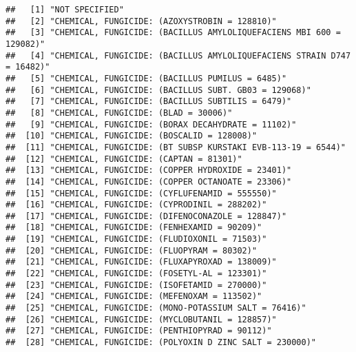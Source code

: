 \documentclass[
]{article}
\begin{document}
\begin{verbatim}
##   [1] "NOT SPECIFIED"                                                                     
##   [2] "CHEMICAL, FUNGICIDE: (AZOXYSTROBIN = 128810)"                                      
##   [3] "CHEMICAL, FUNGICIDE: (BACILLUS AMYLOLIQUEFACIENS MBI 600 = 129082)"                
##   [4] "CHEMICAL, FUNGICIDE: (BACILLUS AMYLOLIQUEFACIENS STRAIN D747 = 16482)"             
##   [5] "CHEMICAL, FUNGICIDE: (BACILLUS PUMILUS = 6485)"                                    
##   [6] "CHEMICAL, FUNGICIDE: (BACILLUS SUBT. GB03 = 129068)"                               
##   [7] "CHEMICAL, FUNGICIDE: (BACILLUS SUBTILIS = 6479)"                                   
##   [8] "CHEMICAL, FUNGICIDE: (BLAD = 30006)"                                               
##   [9] "CHEMICAL, FUNGICIDE: (BORAX DECAHYDRATE = 11102)"                                  
##  [10] "CHEMICAL, FUNGICIDE: (BOSCALID = 128008)"                                          
##  [11] "CHEMICAL, FUNGICIDE: (BT SUBSP KURSTAKI EVB-113-19 = 6544)"                        
##  [12] "CHEMICAL, FUNGICIDE: (CAPTAN = 81301)"                                             
##  [13] "CHEMICAL, FUNGICIDE: (COPPER HYDROXIDE = 23401)"                                   
##  [14] "CHEMICAL, FUNGICIDE: (COPPER OCTANOATE = 23306)"                                   
##  [15] "CHEMICAL, FUNGICIDE: (CYFLUFENAMID = 555550)"                                      
##  [16] "CHEMICAL, FUNGICIDE: (CYPRODINIL = 288202)"                                        
##  [17] "CHEMICAL, FUNGICIDE: (DIFENOCONAZOLE = 128847)"                                    
##  [18] "CHEMICAL, FUNGICIDE: (FENHEXAMID = 90209)"                                         
##  [19] "CHEMICAL, FUNGICIDE: (FLUDIOXONIL = 71503)"                                        
##  [20] "CHEMICAL, FUNGICIDE: (FLUOPYRAM = 80302)"                                          
##  [21] "CHEMICAL, FUNGICIDE: (FLUXAPYROXAD = 138009)"                                      
##  [22] "CHEMICAL, FUNGICIDE: (FOSETYL-AL = 123301)"                                        
##  [23] "CHEMICAL, FUNGICIDE: (ISOFETAMID = 270000)"                                        
##  [24] "CHEMICAL, FUNGICIDE: (MEFENOXAM = 113502)"                                         
##  [25] "CHEMICAL, FUNGICIDE: (MONO-POTASSIUM SALT = 76416)"                                
##  [26] "CHEMICAL, FUNGICIDE: (MYCLOBUTANIL = 128857)"                                      
##  [27] "CHEMICAL, FUNGICIDE: (PENTHIOPYRAD = 90112)"                                       
##  [28] "CHEMICAL, FUNGICIDE: (POLYOXIN D ZINC SALT = 230000)"                              

\end{verbatim}
\end{document}
